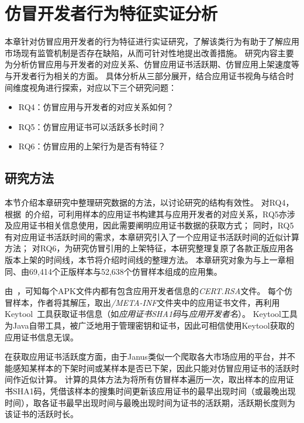 \chapter{仿冒开发者行为特征实证分析}
\label{chp:discoveries_behavior}

本章针对仿冒应用开发者的行为特征进行实证研究，了解该类行为有助于了解应用市场现有监管机制是否存在缺陷，从而可针对性地提出改善措施。
研究内容主要为分析仿冒应用与开发者的对应关系、仿冒应用证书活跃期、仿冒应用上架速度等与开发者行为相关的方面。
具体分析从三部分展开，结合应用证书视角与结合时间维度视角进行探索，对应以下三个研究问题：

\begin{itemize}
    \item RQ4：仿冒应用与开发者的对应关系如何？
    \item RQ5：仿冒应用证书可以活跃多长时间？
    \item RQ6：仿冒应用的上架行为是否有特征？
\end{itemize}

\section{研究方法}
\label{sec:behavior_method}

本节介绍本章研究中整理研究数据的方法，以讨论研究的结构有效性。
对RQ4，根据~的介绍，可利用样本的应用证书构建其与应用开发者的对应关系，RQ5亦涉及应用证书相关信息使用，因此需要阐明应用证书数据的获取方式；
同时，RQ5有对应用证书活跃时间的需求，本章研究引入了一个应用证书活跃时间的近似计算方法；
对RQ6，为研究仿冒引用的上架特征，本研究整理复原了各款正版应用各版本上架的时间线，本节将介绍时间线的整理方法。
本章研究对象为与上一章相同、由69,414个正版样本与52,638个仿冒样本组成的应用集。

由~，可知每个APK文件内都有包含应用开发者信息的\textit{CERT.RSA}文件。
每个仿冒样本，作者将其解压，取出\textit{/META-INF}文件夹中的应用证书文件，再利用Keytool~\cite{keytool}工具获取证书信息（如\textit{应用证书SHA1码}与\textit{应用开发者名}）。
Keytool工具为Java自带工具，被广泛地用于管理密钥和证书，因此可相信使用Keytool获取的应用证书信息无误。

在获取应用证书活跃度方面，由于Janus类似一个爬取各大市场应用的平台，并不能感知某样本的下架时间或某样本是否已下架，因此只能对仿冒应用证书的活跃时间作近似计算。
计算的具体方法为将所有仿冒样本遍历一次，取出样本的应用证书SHA1码，凭借该样本的搜集时间更新该应用证书的最早出现时间（或最晚出现时间），取各证书最早出现时间与最晚出现时间为证书的活跃期，活跃期长度则为该证书的活跃时长。

